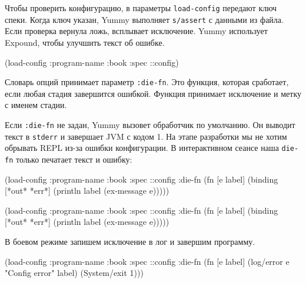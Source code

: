 
Чтобы проверить конфигурацию, в параметры \verb|load-config| передают ключ
спеки. Когда ключ указан, Yummy выполняет \verb|s/assert| с данными из
файла. Если проверка вернула ложь, всплывает исключение. Yummy использует
Expound, чтобы улучшить текст об ошибке.

\begin{english}
  \begin{clojure}
(load-config {:program-name :book
              :spec ::config})
  \end{clojure}
\end{english}


Словарь опций принимает параметр \verb|:die-fn|. Это функция, которая
сработает, если любая стадия завершится ошибкой. Функция принимает исключение
и метку с именем стадии.


Если \verb|:die-fn| не задан, Yummy вызовет обработчик по умолчанию. Он
выводит текст в \verb|stderr| и завершает JVM с кодом 1. На этапе разработки
мы не хотим обрывать REPL из-за ошибки конфигурации. В интерактивном сеансе
наша \verb|die-fn| только печатает текст и ошибку:

\ifnarrow

\begin{english}
  \begin{clojure}
(load-config
 {:program-name :book
  :spec ::config
  :die-fn (fn [e label]
            (binding [*out* *err*]
              (println label
                (ex-message e))))})
  \end{clojure}
\end{english}

\else

\begin{english}
  \begin{clojure}
(load-config
 {:program-name :book
  :spec ::config
  :die-fn (fn [e label]
            (binding [*out* *err*]
              (println label (ex-message e))))})
  \end{clojure}
\end{english}

\fi

В боевом режиме запишем исключение в лог и завершим программу.


\ifnarrow

\begin{english}
  \begin{clojure}
(load-config
 {:program-name :book
  :spec ::config
  :die-fn (fn [e label]
            (log/error e
              "Config error" label)
            (System/exit 1))})
  \end{clojure}
\end{english}

